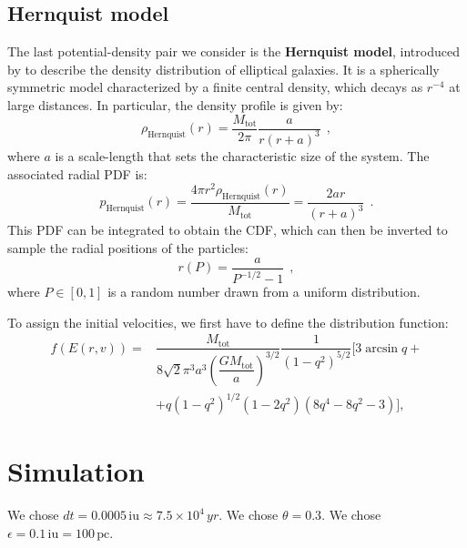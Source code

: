 \documentclass[fleqn,usenatbib]{mnras}
\begin{document}
\subsection{Hernquist model}\label{sec:Hernquist_model}
The last potential-density pair we consider is the \textbf{Hernquist model}, introduced by \cite{Hernquist1990} to describe the density distribution of elliptical galaxies.
It is a spherically symmetric model characterized by a finite central density, which decays as $r^{-4}$ at large distances. 
In particular, the density profile is given by:
\begin{equation}
    \rho_\text{Hernquist}(r) = \dfrac{M_\text{tot}}{2\pi} \dfrac{a}{r \left(r+a\right)^3} \:\: ,
    \label{eq:hernquist_density}
\end{equation}
where $a$ is a scale-length that sets the characteristic size of the system.
The associated radial PDF is:
\begin{equation}
    p_\text{Hernquist}(r) = \dfrac{4\pi r^2 \rho_\text{Hernquist}(r)}{M_\text{tot}} = 
    \dfrac{2ar}{\left(r+a\right)^3} \:\: .
    \label{eq:hernquist_radial_pdf}
\end{equation}
This PDF can be integrated to obtain the CDF, which can then be inverted to sample the radial positions of the particles:
\begin{equation}
    r(P) = \dfrac{a}{P^{-1/2} - 1} \:\: ,
    \label{eq:hernquist_radial_sampling}
\end{equation}
where $P \in [0,1]$ is a random number drawn from a uniform distribution.
\vspace{0.5em}

To assign the initial velocities, we first have to define the distribution function:
\begin{equation}
    \begin{split}
    f\left(E(r,v)\right) =& \dfrac{M_\text{tot}}{8 \sqrt{2} \pi^3 a^3 \left(\dfrac{GM_\text{tot}}{a}\right)^{3/2}} \dfrac{1}{\left(1-q^2\right)^{5/2}} [3\arcsin{q} +\\
    &+ q\left(1-q^2\right)^{1/2} \left(1-2q^2\right) \left(8q^4-8q^2-3\right)] ,
    \label{eq:hernquist_distribution_function}
    \end{split}
\end{equation}


\section{Simulation}\label{sec:simulation}
We chose $dt = 0.0005 \,\text{iu} \approx 7.5 \times 10^4 \,yr$. We chose $\theta=0.3$. We chose $\epsilon=0.1 \,\text{iu} = 100 \,\text{pc}$.
\end{document}
